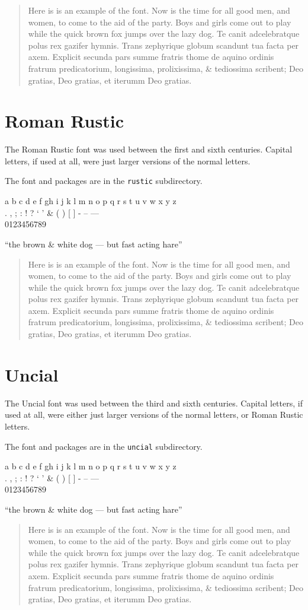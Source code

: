 \documentclass{article}
\newcommand{\abc}{a b c d e f gh i j k l m n o p q r s t u v w x y z}
\newcommand{\punct}{. , ; : ! ? ` ' \& ( ) [ ]}
\newcommand{\figs}{0123456789}
\newcommand{\dashes}{- -- ---}
\newcommand{\ligs}{``the brown \& white dog --- but fast acting hare''}
\newcommand{\sentence}{%
    now is the time for all good
men, and women, to come to the aid of the party while the quick brown fox
jumps over the lazy dog.}
\newcommand{\latin}{%
    Te canit adcelebratque polus rex gazifer hymnis.
Trans zephyrique globum scandunt tua facta per axem.
Explicit secunda pars summe fratris thome de aquino
ordinis fratrum predicatorium, longissima, prolixissima,
\& tediossima scribent; Deo gratias, Deo gratias, et iterumm
Deo gratias.
}
\renewcommand{\sentence}{%
Here is is an example of the font. Now is the time for all good
men, and women, to come to the aid of the party. Boys and girls come
out to play while the quick brown fox jumps over the lazy dog.}
\begin{document}
\begin{quotation}
\renewcommand{\baselinestretch}{1.7}
\sqrcfamily 
\sentence{} \latin \par
\end{quotation}


\clearpage
\section{Roman Rustic}

    The Roman Rustic font was used between the first and sixth centuries.
Capital letters, if used at all, were just larger versions of the normal letters.

    The font and packages are in the \texttt{rustic} subdirectory.

\begin{center}
\rustfamily
\abc \\
\punct{} \dashes \\
\figs 

\ligs\par
\end{center}

\begin{quotation}
\renewcommand{\baselinestretch}{1.9}
\rustfamily 
\sentence{} \latin \par
\end{quotation}


\clearpage
\section{Uncial}

    The Uncial font was used between the third and sixth centuries. 
Capital letters, if used at all, were either just larger versions of the 
normal letters, or Roman Rustic letters.

    The font and packages are in the \texttt{uncial} subdirectory.

\begin{center}
\unclfamily
\abc \\
\punct{} \dashes \\
\figs 

\ligs\par
\end{center}

\begin{quotation}
\renewcommand{\baselinestretch}{1.37}
\unclfamily
\sentence{} \latin \par
\end{quotation}
\end{document}
